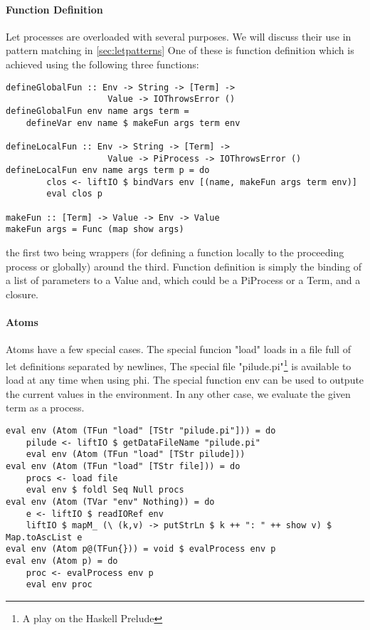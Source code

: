 \paragraph{Function Definition}
Let processes are overloaded with several purposes. We will discuss their use in pattern matching in \ref{sec:letpatterns} One of these is function definition which is achieved using the following three functions:
\begin{verbatim}
defineGlobalFun :: Env -> String -> [Term] -> 
                    Value -> IOThrowsError ()
defineGlobalFun env name args term = 
    defineVar env name $ makeFun args term env

defineLocalFun :: Env -> String -> [Term] -> 
                    Value -> PiProcess -> IOThrowsError ()
defineLocalFun env name args term p = do
        clos <- liftIO $ bindVars env [(name, makeFun args term env)]
        eval clos p

makeFun :: [Term] -> Value -> Env -> Value
makeFun args = Func (map show args)
\end{verbatim}
the first two being wrappers (for defining a function locally to the proceeding process or globally) around the third. Function definition is simply the binding of a list of parameters to a Value and, which could be a PiProcess or a Term, and a closure.

\paragraph{Atoms}
Atoms have a few special cases. The special funcion "load" loads in a file full of let definitions separated by newlines,
The special file "pilude.pi"\footnote{A play on the Haskell Prelude} is available to load at any time when using phi. The special function env can be used to outpute the current values in the environment. In any other case, we evaluate the given term as a process.
\begin{verbatim}
eval env (Atom (TFun "load" [TStr "pilude.pi"])) = do
    pilude <- liftIO $ getDataFileName "pilude.pi"
    eval env (Atom (TFun "load" [TStr pilude]))
eval env (Atom (TFun "load" [TStr file])) = do
    procs <- load file  
    eval env $ foldl Seq Null procs
eval env (Atom (TVar "env" Nothing)) = do
    e <- liftIO $ readIORef env
    liftIO $ mapM_ (\ (k,v) -> putStrLn $ k ++ ": " ++ show v) $ Map.toAscList e
eval env (Atom p@(TFun{})) = void $ evalProcess env p
eval env (Atom p) = do
    proc <- evalProcess env p
    eval env proc
\end{verbatim}
